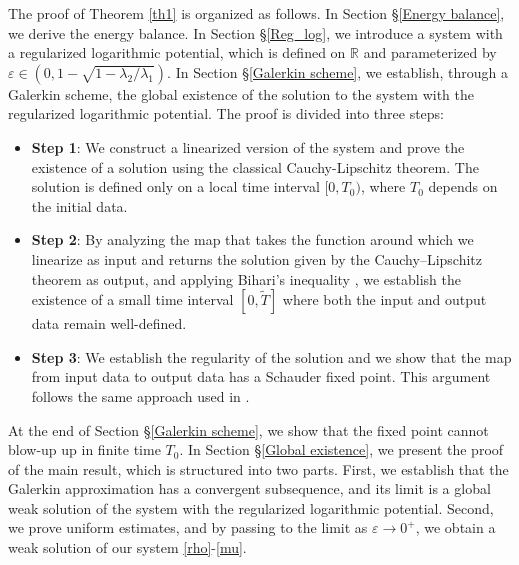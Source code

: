 \documentclass[11pt]{article}
\begin{document}
The proof of Theorem \ref{th1} is organized as follows. In Section \S\ref{Energy balance}, we derive the energy balance. In Section \S\ref{Reg_log}, we introduce a system with a regularized logarithmic potential, which is defined on $\mathbb{R}$ and parameterized by $\varepsilon \in \left(0,1-\sqrt{1-{\lambda_2}/{\lambda_1}}\right)$. In Section \S\ref{Galerkin scheme}, we establish, through a Galerkin scheme, the global existence of the solution to the system with the regularized logarithmic potential. The proof is divided into three steps:
\begin{itemize}
\item \textbf{Step 1}: We construct a linearized version of the system and prove the existence of a solution using the classical Cauchy-Lipschitz theorem. The solution is defined only on a local time interval $[0,T_0)$, where $T_0$ depends on the initial data.
\item \textbf{Step 2}: By analyzing the map that takes the function around which we linearize as input and returns the solution given by the Cauchy–Lipschitz theorem as output, and applying Bihari's inequality \cite{bihari1956generalization}, we establish the existence of a small time interval $[0,\widetilde{T}]$ where both the input and output data remain well-defined.

\item \textbf{Step 3}: We establish the regularity of the solution and we show that the map from input data to output data has a Schauder fixed point. This argument follows the same approach used in \cite[see Appendix A]{giorgini2020weak}.
\end{itemize}
At the end of Section \S\ref{Galerkin scheme}, we show that the fixed point cannot blow-up up in finite time $T_0$. In Section \S\ref{Global existence}, we present the proof of the main result, which is structured into two parts. First, we establish that the Galerkin approximation has a convergent subsequence, and its limit is a global weak solution of the system with the regularized logarithmic potential. Second, we prove uniform estimates, and by passing to the limit as $\varepsilon \rightarrow 0^{+}$, we obtain a weak solution of our system \eqref{rho}-\eqref{mu}.
\end{document}
